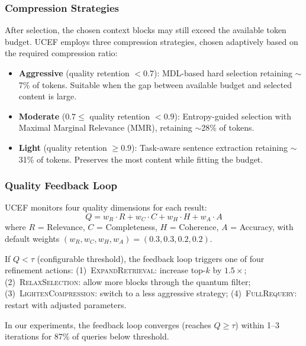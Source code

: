 \documentclass[11pt,a4paper]{article}
\newcommand{\ucef}{\textsf{UCEF}}
\begin{document}
\subsubsection{Compression Strategies}

After selection, the chosen context blocks may still exceed the available
token budget.  \ucef{} employs three compression strategies, chosen
adaptively based on the required compression ratio:

\begin{itemize}
  \item \textbf{Aggressive} (quality retention $< 0.7$):
    MDL-based hard selection retaining $\sim$7\% of tokens.  Suitable when
    the gap between available budget and selected content is large.

  \item \textbf{Moderate} ($0.7 \leq$ quality retention $< 0.9$):
    Entropy-guided selection with Maximal Marginal Relevance (MMR),
    retaining $\sim$28\% of tokens.

  \item \textbf{Light} (quality retention $\geq 0.9$):
    Task-aware sentence extraction retaining $\sim$31\% of tokens.
    Preserves the most content while fitting the budget.
\end{itemize}

\subsubsection{Quality Feedback Loop}

\ucef{} monitors four quality dimensions for each result:
\begin{equation}
  Q = w_R \cdot R + w_C \cdot C + w_H \cdot H + w_A \cdot A
  \label{eq:quality}
\end{equation}
where $R$ = Relevance, $C$ = Completeness, $H$ = Coherence, $A$ = Accuracy,
with default weights $(w_R, w_C, w_H, w_A) = (0.3, 0.3, 0.2, 0.2)$.

If $Q < \tau$ (configurable threshold), the feedback loop triggers one of
four refinement actions:
(1)~\textsc{ExpandRetrieval}: increase top-$k$ by $1.5\times$;
(2)~\textsc{RelaxSelection}: allow more blocks through the quantum filter;
(3)~\textsc{LightenCompression}: switch to a less aggressive strategy;
(4)~\textsc{FullRequery}: restart with adjusted parameters.

In our experiments, the feedback loop converges (reaches $Q \geq \tau$)
within 1--3 iterations for 87\% of queries below threshold.
\end{document}

